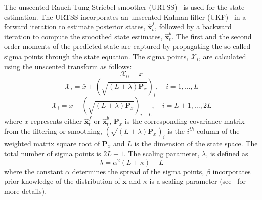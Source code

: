 \documentclass[10pt,a4paper]{article}
\begin{document}
The unscented Rauch Tung Striebel smoother (URTSS)~\cite{Sarkka2010} is used for the state estimation. The URTSS incorporates an unscented Kalman filter (UKF)~\cite{Julier1997, Merwe2003} in a forward iteration to estimate posterior states, $\hat{\mathbf x}_t^{f}$, followed by a backward iteration to compute the smoothed state estimates, $\hat{\mathbf x}_t^{b}$. The first and the second order moments of the predicted state are captured by propagating the so-called sigma points through the state equation. The sigma points, $\mathcal X_i$, are calculated using the unscented transform as follows:
\begin{equation}\label{eq:sigmapoints1}
	\mathcal X_{0}=\bar x 
\end{equation}
\begin{equation}
	\mathcal X_{i}=\bar x+(\sqrt{( L + \lambda)\mathbf P_x})_i, \quad i=1, \dots, L 
\end{equation}
\begin{equation}\label{eq:sigmapoints2}
	\mathcal X_{i}=\bar x-(\sqrt{( L + \lambda)\mathbf P_x})_{i- L}, \quad i= L+1, \dots, 2 L 
\end{equation}
where $\bar x$ represents either $\hat{\mathbf x}_t^{f}$ or $\hat{\mathbf x}_t^{b}$, $\mathbf{P}_x$ is the corresponding covariance matrix from the filtering or smoothing, $(\sqrt{( L + \lambda)\mathbf P_x})_i$ is the $i^{th}$ column of the weighted matrix square root of $\mathbf P_x$ and $L$ is the dimension of the state space. The total number of sigma points is $2L+1$. The scaling parameter, $\lambda$, is defined as 
\begin{equation}\label{eq:sigmapoints3}
	\lambda=\alpha^2( L+\kappa) - L 
\end{equation}
where the constant $\alpha$ determines the spread of the sigma points, $\beta$ incorporates prior knowledge of the distribution of $\mathbf{x}$ and $\kappa$ is a scaling parameter (see~\cite{Haykin2001} for more details). 
\end{document}
